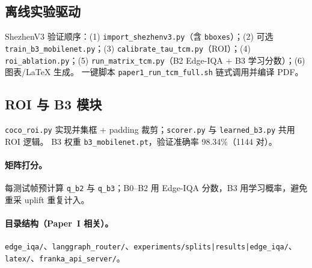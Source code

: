 \begin{table}[t]
\centering
\caption{环境变量（\texttt{franka\_api\_server}）。}
\label{tab:env-vars-zh}
\small
{}
\end{table}

\subsection{离线实验驱动}
ShezhenV3 验证顺序：(1) \texttt{import\_shezhenv3.py}（含 \texttt{bboxes}）；(2) 可选 \texttt{train\_b3\_mobilenet.py}；(3) \texttt{calibrate\_tau\_tcm.py}（ROI）；(4) \texttt{roi\_ablation.py}；(5) \texttt{run\_matrix\_tcm.py}（B2 Edge-IQA + B3 学习分数）；(6) 图表/\LaTeX{} 生成。
一键脚本 \texttt{paper1\_run\_tcm\_full.sh} 链式调用并编译 PDF。

\subsection{ROI 与 B3 模块}
\texttt{coco\_roi.py} 实现并集框 + padding 裁剪；\texttt{scorer.py} 与 \texttt{learned\_b3.py} 共用 ROI 逻辑。
B3 权重 \texttt{b3\_mobilenet.pt}，验证准确率 98.34\%（1144 对）。

\paragraph{矩阵打分。}
每测试帧预计算 \texttt{q\_b2} 与 \texttt{q\_b3}；B0--B2 用 Edge-IQA 分数，B3 用学习概率，避免重采 uplift 重复计入。

\paragraph{目录结构（Paper~I 相关）。}
\texttt{edge\_iqa/}、\texttt{langgraph\_router/}、\texttt{experiments/splits|results|edge\_iqa/}、\texttt{latex/}、\texttt{franka\_api\_server/}。

